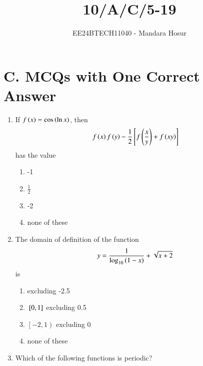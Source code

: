 \documentclass[journal,12pt,twocolumn]{IEEEtran}
\theoremstyle{remark}
\begin{document}

\vspace{3cm}

\title{10/A/C/5-19}
\author{EE24BTECH11040 - Mandara Hosur}
\maketitle
\newpage
\bigskip

\renewcommand{\thefigure}{\theenumi}
\renewcommand{\thetable}{\theenumi}

\section*{\textbf{C. MCQs with One Correct Answer}}

\begin{enumerate}

\item If $f\left(x\right) = \cos{\ensuremath{\left(\ln{x}\right)}}$, then $$f\left(x\right)f\left(y\right)-\frac{1}{2} {}\left[f\left(\frac{x}{y}\right)+f\left(xy\right)\right]$$ has the value

\hfill{}

\begin{multicols}{2}
	\begin{enumerate}
		\item -1 
		\item $\frac{1}{2}$
		\item -2 
		\item none of these
	\end{enumerate}
\end{multicols}

\item The domain of definition of the function
$$y = \frac{1}{\log_{10}{\left(1-x\right)}} + \sqrt{x+2}$$ is

\hfill{}

\begin{multicols}{2}
	\begin{enumerate}
		\item {} excluding -2.5 
		\item ${}\left[0, 1\right]$ excluding 0.5
		\item $\left[-2, 1\right)$ excluding 0 
		\item none of these
	\end{enumerate}
\end{multicols}

\item Which of the following functions is periodic?


\end{enumerate}
\end{document}
